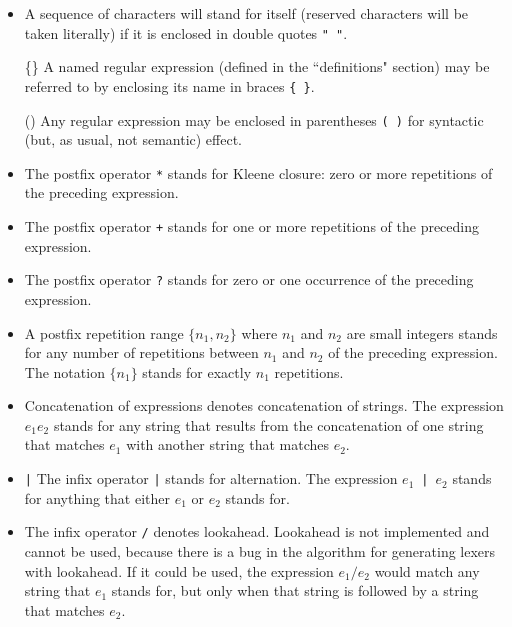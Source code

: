 \begin{itemize}
\begin{tabular}{ll}
        \end{tabular}

\item[\verb|"|] A sequence of characters will stand for itself (reserved
        characters will be taken literally) if it is enclosed in
        double quotes \verb|" "|.

\item[\{\}]     A named regular expression (defined in the ``definitions"
        section) may be referred to by enclosing its name in
        braces \verb|{ }|.

\item[()] Any regular expression may be enclosed in parentheses \verb|( )|
        for syntactic (but, as usual, not semantic) effect.

\item[\verb|*|] The postfix operator \verb|*| stands for Kleene closure:
        zero or more repetitions of the preceding expression.

\item[\verb|+|] The postfix operator \verb|+| stands for one or more repetitions
        of the preceding expression.

\item[\verb|?|] The postfix operator \verb|?| stands for zero or one occurrence of
        the preceding expression.

\item   A postfix repetition range $\{n_1,n_2\}$ where $n_1$ and $n_2$ are small
        integers stands for any number of repetitions between $n_1$ and $n_2$
        of the preceding expression.  The notation $\{n_1\}$ stands for
        exactly $n_1$ repetitions.

\item   Concatenation of expressions denotes concatenation of strings.
        The expression $e_1 e_2$ stands for any string that results from
        the concatenation of one string that matches $e_1$ with another
        string that matches $e_2$.

\item\verb-|-   The infix operator \verb-|- stands for alternation.  The expression
        $e_1$~\verb"|"~$e_2$  stands for anything that either $e_1$ or $e_2$ stands for.

\item[\verb|/|] The infix operator \verb|/| denotes lookahead.  Lookahead is not
        implemented and cannot be used, because there is a bug
        in the algorithm for generating lexers with lookahead.  If
        it could be used, the expression $e_1 / e_2$ would match any string
        that $e_1$ stands for, but only when that string is followed by a
        string that matches $e_2$.


\end{itemize}
